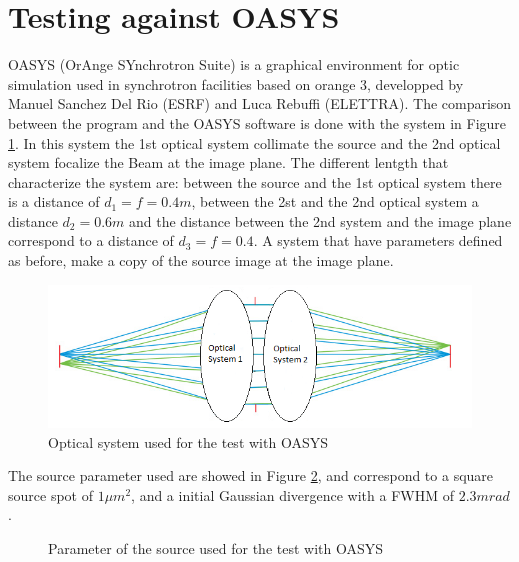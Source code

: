 \section{Testing against OASYS}
%
OASYS (OrAnge SYnchrotron Suite) is a graphical environment for optic simulation used in synchrotron facilities based on orange 3, developped by Manuel Sanchez Del Rio (ESRF) and Luca Rebuffi (ELETTRA).
The comparison between the program and the OASYS software is done with the system in Figure \ref{fig: Optical system}. In this system the 1st optical system collimate the source and the 2nd optical system focalize the Beam at the image plane. The different lentgth that characterize the system are: between the source and the 1st optical system there is a  distance of  $d_1 = f = 0.4 m $, between the 2st and the 2nd optical system a distance $d_2 = 0.6 m $ and the distance between the 2nd system and the image plane correspond to a distance of $d_3 = f = 0.4$. A system that have parameters defined as before, make a copy of the source image at the image plane.
%
\begin{figure}[]
%
\centering
%
\includegraphics[width=.6\textwidth]{Immagini/Chapter4/OpticalSystems}
%
\caption{Optical system used for the test with OASYS}
%
\label{fig: Optical system}
%
\end{figure}
%
The source parameter used are showed in Figure \ref{fig: Source Parameter for OASYS}, and correspond to  a square source spot of $1 \mu m^2 $, and a initial Gaussian divergence with a FWHM of $2.3 mrad $.
\begin{figure}[]
%
\centering
%
%
%
\caption{Parameter of the source used for the test with OASYS}
%
\label{fig: Source Parameter for OASYS}
%
\end{figure}
